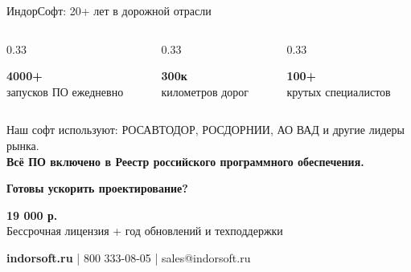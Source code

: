 \documentclass[aspectratio=169]{beamer}
\newcommand{\hl}[1]{\textcolor{AccentDrive}{\textbf{#1}}}
\newcommand{\tech}[1]{\textcolor{AccentFresh}{\textbf{#1}}}
\begin{document}
\begin{frame}{ИндорСофт: 20+ лет в дорожной отрасли}
    \begin{columns}
        \begin{column}{0.33\textwidth}
            \begin{center}
                \Huge \hl{4000+} \\
                \normalsize запусков ПО ежедневно
            \end{center}
        \end{column}
        \begin{column}{0.33\textwidth}
            \begin{center}
                \Huge \tech{300к} \\
                \normalsize километров дорог
            \end{center}
        \end{column}
        \begin{column}{0.33\textwidth}
            \begin{center}
                \Huge \hl{100+} \\
                \normalsize крутых специалистов
            \end{center}
        \end{column}
    \end{columns}
    
    \vspace{1cm}
    \begin{center}
        \normalsize Наш софт используют: РОСАВТОДОР, РОСДОРНИИ, АО ВАД и другие лидеры рынка. \\
        \tech{Всё ПО включено в Реестр российского программного обеспечения.}
    \end{center}
\end{frame}

\begin{frame}
    \begin{center}
        \Huge \hl{Готовы ускорить проектирование?}
        
        \vspace{1cm}
        \Large \textbf{19 000 р.} \\
        \normalsize Бессрочная лицензия + год обновлений и техподдержки
        
        \vspace{1cm}
        
        \vspace{0.8cm}
        \normalsize \tech{indorsoft.ru} \quad |  800 333-08-05 \quad | \quad sales@indorsoft.ru
    \end{center}
\end{frame}
\end{document}
